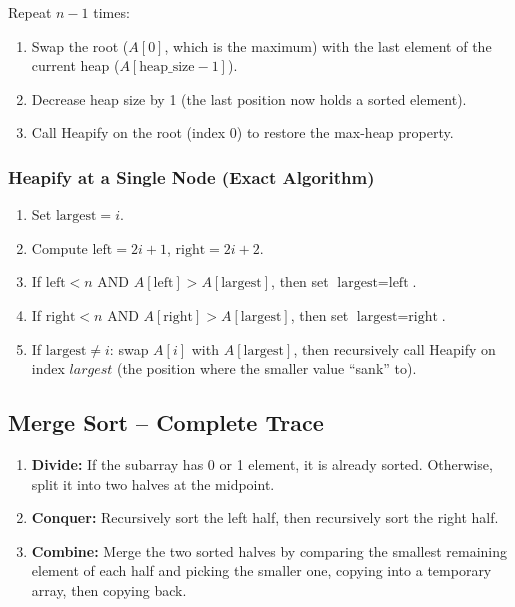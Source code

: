 \documentclass[12pt,portrait]{article}
\begin{document}
\begin{rulebox}
Repeat $n-1$ times:
\begin{enumerate}[leftmargin=*]
    \item Swap the root ($A[0]$, which is the maximum) with the last element of the current heap ($A[\text{heap\_size}-1]$).
    \item Decrease heap size by 1 (the last position now holds a sorted element).
    \item Call Heapify on the root (index 0) to restore the max-heap property.
\end{enumerate}
\end{rulebox}

\subsubsection{Heapify at a Single Node (Exact Algorithm)}

\begin{rulebox}
\begin{enumerate}[leftmargin=*]
    \item Set $\text{largest} = i$.
    \item Compute $\text{left} = 2i+1$, $\text{right} = 2i+2$.
    \item If $\text{left} < n$ AND $A[\text{left}] > A[\text{largest}]$, then set $\text{largest} = \text{left}$.
    \item If $\text{right} < n$ AND $A[\text{right}] > A[\text{largest}]$, then set $\text{largest} = \text{right}$.
    \item If $\text{largest} \neq i$: swap $A[i]$ with $A[\text{largest}]$, then recursively call Heapify on index $largest$ (the position where the smaller value ``sank'' to).
\end{enumerate}
\end{rulebox}

\subsection{Merge Sort -- Complete Trace}

\begin{rulebox}
\begin{enumerate}[leftmargin=*]
    \item \textbf{Divide:} If the subarray has 0 or 1 element, it is already sorted. Otherwise, split it into two halves at the midpoint.
    \item \textbf{Conquer:} Recursively sort the left half, then recursively sort the right half.
    \item \textbf{Combine:} Merge the two sorted halves by comparing the smallest remaining element of each half and picking the smaller one, copying into a temporary array, then copying back.
\end{enumerate}
\end{rulebox}
\end{document}
